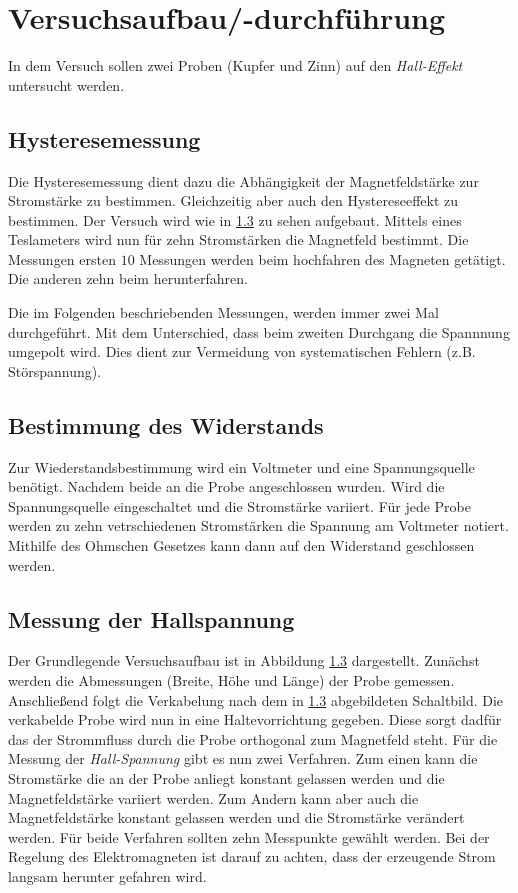 \section{Versuchsaufbau/-durchführung}
In dem Versuch sollen zwei Proben (Kupfer und Zinn) auf den \emph{Hall-Effekt} untersucht werden.

\subsection{Hysteresemessung}
Die Hysteresemessung dient dazu die Abhängigkeit der Magnetfeldstärke 
zur Stromstärke zu bestimmen. Gleichzeitig aber auch den Hystereseeffekt 
zu bestimmen. Der Versuch wird wie in \ref{} zu sehen aufgebaut.
Mittels eines Teslameters wird nun für zehn Stromstärken die Magnetfeld bestimmt.
Die Messungen ersten $10$ Messungen werden beim hochfahren des Magneten getätigt.
Die anderen zehn beim herunterfahren.

\begin{center}
Die im Folgenden beschriebenden Messungen, werden immer zwei Mal durchgeführt.
Mit dem Unterschied, dass beim zweiten Durchgang die Spannnung umgepolt wird.
Dies dient zur Vermeidung von systematischen Fehlern (z.B. Störspannung).
\end{center}

\subsection{Bestimmung des Widerstands}
Zur Wiederstandsbestimmung wird ein Voltmeter und 
eine Spannungsquelle benötigt.
Nachdem beide an die Probe angeschlossen wurden. 
Wird die Spannungsquelle eingeschaltet und die Stromstärke variiert. 
Für jede Probe werden zu zehn vetrschiedenen Stromstärken 
die Spannung am Voltmeter notiert.
Mithilfe des Ohmschen Gesetzes kann dann auf den Widerstand geschlossen werden.

\subsection{Messung der Hallspannung}
Der Grundlegende Versuchsaufbau ist in Abbildung \ref{} dargestellt.
Zunächst werden die Abmessungen (Breite, Höhe und Länge) der Probe gemessen.
Anschließend folgt die Verkabelung nach dem in \ref{} abgebildeten Schaltbild.
Die verkabelde Probe wird nun in eine Haltevorrichtung gegeben. Diese sorgt dadfür das 
der Strommfluss durch die Probe orthogonal zum Magnetfeld steht.
Für die Messung der \emph{Hall-Spannung} gibt es nun zwei Verfahren. 
Zum einen kann die Stromstärke die an der Probe anliegt konstant gelassen werden und
die Magnetfeldstärke variiert werden. Zum Andern kann 
aber auch die Magnetfeldstärke konstant gelassen werden und die Stromstärke verändert
werden. Für beide Verfahren sollten zehn Messpunkte gewählt werden.
Bei der Regelung des Elektromagneten ist darauf zu achten, dass der 
erzeugende Strom langsam herunter gefahren wird.
